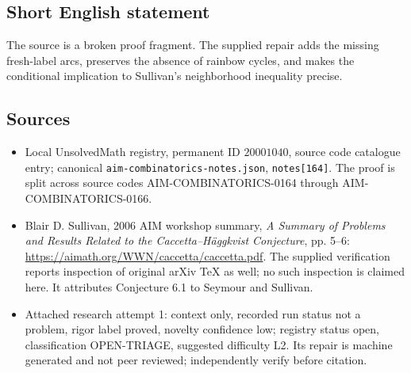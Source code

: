 \documentclass[11pt]{article}
\begin{document}
\subsection{Short English statement}
The source is a broken proof fragment. The supplied repair adds the missing fresh-label arcs, preserves the absence of rainbow cycles, and makes the conditional implication to Sullivan's neighborhood inequality precise.
\subsection{Sources}
\begin{itemize}
\item Local UnsolvedMath registry, permanent ID $20001040$, source code catalogue entry; canonical \texttt{aim-combinatorics-notes.json}, \texttt{notes[164]}. The proof is split across source codes AIM-COMBINATORICS-0164 through AIM-COMBINATORICS-0166.
\item Blair D. Sullivan, 2006 AIM workshop summary, \emph{A Summary of Problems and Results Related to the Caccetta--H\"aggkvist Conjecture}, pp. 5--6: \url{https://aimath.org/WWN/caccetta/caccetta.pdf}. The supplied verification reports inspection of original arXiv TeX as well; no such inspection is claimed here. It attributes Conjecture 6.1 to Seymour and Sullivan.
\item Attached research attempt 1: context only, recorded run status not a problem, rigor label proved, novelty confidence low; registry status open, classification OPEN-TRIAGE, suggested difficulty L2. Its repair is machine generated and not peer reviewed; independently verify before citation.
\end{itemize}
\end{document}
